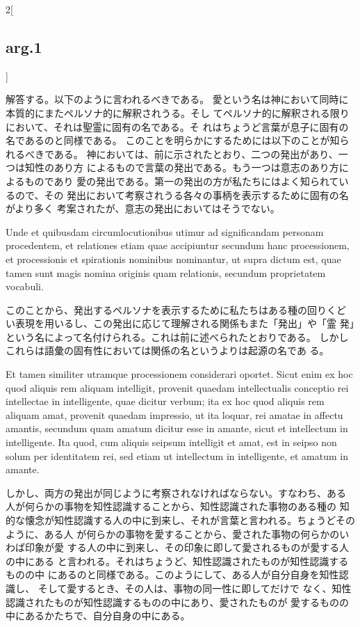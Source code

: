 \documentclass[paper=a4paper,fontsize=10pt,jafontsize=9pt,titlepage]{jlreq}
\begin{document}
\begin{paracol}{2}[\subsection{arg.1}]
\switchcolumn

解答する。以下のように言われるべきである。
愛という名は神において同時に本質的にまたペルソナ的に解釈されうる。そし
 てペルソナ的に解釈される限りにおいて、それは聖霊に固有の名である。そ
 れはちょうど言葉が息子に固有の名であるのと同様である。
このことを明らかにするためには以下のことが知られるべきである。
神においては、前に示されたとおり、二つの発出があり、一つは知性のあり方
 によるもので言葉の発出である。もう一つは意志のあり方によるものであり
 愛の発出である。第一の発出の方が私たちにはよく知られているので、その
 発出において考察されうる各々の事柄を表示するために固有の名がより多く
 考案されたが、意志の発出においてはそうでない。

\switchcolumn*

Unde et quibusdam
circumlocutionibus utimur ad significandam personam procedentem, et
relationes etiam quae accipiuntur secundum hanc processionem, et
processionis et spirationis nominibus nominantur, ut supra dictum est,
quae tamen sunt magis nomina originis quam relationis, secundum
proprietatem vocabuli.

\switchcolumn

このことから、発出するペルソナを表示するために私たちはある種の回りくど
 い表現を用いるし、この発出に応じて理解される関係もまた「発出」や「霊
 発」という名によって名付けられる。これは前に述べられたとおりである。
 しかしこれらは語彙の固有性においては関係の名というよりは起源の名であ
 る。

\switchcolumn*

Et tamen similiter utramque processionem
considerari oportet. Sicut enim ex hoc quod aliquis rem aliquam
intelligit, provenit quaedam intellectualis conceptio rei intellectae
in intelligente, quae dicitur verbum; ita ex hoc quod aliquis rem
aliquam amat, provenit quaedam impressio, ut ita loquar, rei amatae in
affectu amantis, secundum quam amatum dicitur esse in amante, sicut et
intellectum in intelligente. Ita quod, cum aliquis seipsum intelligit
et amat, est in seipso non solum per identitatem rei, sed etiam ut
intellectum in intelligente, et amatum in amante.

\switchcolumn

しかし、両方の発出が同じように考察されなければならない。すなわち、ある
 人が何らかの事物を知性認識することから、知性認識された事物のある種の
 知的な懐念が知性認識する人の中に到来し、それが言葉と言われる。ちょうどそのように、ある人
 が何らかの事物を愛することから、愛された事物の何らかのいわば印象が愛
 する人の中に到来し、その印象に即して愛されるものが愛する人の中にある
 と言われる。それはちょうど、知性認識されたものが知性認識するものの中
 にあるのと同様である。このようにして、ある人が自分自身を知性認識し、
 そして愛するとき、その人は、事物の同一性に即してだけで
 なく、知性認識されたものが知性認識するものの中にあり、愛されたものが
 愛するものの中にあるかたちで、自分自身の中にある。


\end{paracol}
\end{document}
